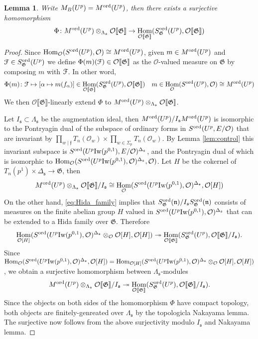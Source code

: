 \documentclass[leqno]{amsart}
\newtheorem{lem}[thm]{Lemma}
\theoremstyle{definition}
\theoremstyle{remark}
\newcommand{\oo}{\mathcal{O}}
\DeclareMathOperator{\Hom}{Hom}
\newcommand{\ff}{\mathfrak{f}}
\newcommand{\fn}{\mathfrak{n}}
\newcommand{\fs}{\mathfrak{s}}
\newcommand{\fG}{\mathfrak{G}}
\newcommand{\Iw}{\textnormal{Iw}} %
\newcommand{\euF}{\EuScript{F}} %
\newcommand{\ord}{\textnormal{ord}} %
\begin{document}
\begin{lem}\label{prop:ord_to_dual}
    Write $M_B(U^p)=M^{\ord}(U^p)$, then there exists
    a surjective homomorphism
	\[
		\Phi\colon M^{\ord}(U^p)\otimes_{\Lambda_\fs}
        \oo\llbracket\fG\rrbracket \to 
		\Hom_{\oo\llbracket\fG\rrbracket}
		(S_\fG^{\ord}(U^p),\oo\llbracket\fG\rrbracket)
	\]
\end{lem}
\begin{proof}
Since $\Hom_\oo(S^{\ord}(U^p),\oo)\cong M^{\ord}(U^p)$,
given $m\in M^{\ord}(U^p)$ and
$\euF\in S_\fG^{\ord}(U^p)$
we define $\Phi(m)(\euF)\in\oo\llbracket\fG\rrbracket$ as the 
$\oo$-valued measure on $\fG$
by composing $m$ with $\euF$.
In other word, 
\begin{equation}
	\Phi(m)\colon \euF\mapsto
	[\alpha\mapsto m(f_\alpha)]
	\in \Hom_{\oo\llbracket\fG\rrbracket}
	(S_\fG^{\ord}(U^p),\oo\llbracket\fG\rrbracket)\quad
	m\in \Hom_\oo(S^{\ord}(U^p),\oo)\cong M^{\ord}(U^p)
\end{equation}
We then $\oo\llbracket\fG\rrbracket$-linearly extend $\Phi$ to
$M^{\ord}(U^p)\otimes_{\Lambda_\fs}
\oo\llbracket\fG\rrbracket$.

Let $I_\fs\subset\Lambda_{\fs}$
be the augmentation ideal,
then $M^{\ord}(U^p)/I_\fs M^{\ord}(U^p)$
is isomorphic to the Pontryagin dual of the subspace of
ordinary forms in $S^{\ord}(U^p,E/\oo)$ that are invariant by
$\prod_{w\mid \ff}T_n(\oo_w)\times \prod_{w\in\Sigma_p}T_n(\oo_w)$.
By Lemma \ref{lem:control}
this invariant subspace is 
$S^{\ord}(U^p\Iw(p^{0,1}),E/\oo)^{\Delta_{\fs}}$,
and the Pontryagin dual of which is isomorphic to
$\Hom_{\oo}(S^{\ord}(U^p\Iw(p^{0,1}),\oo)^{\Delta_{\fs}},\oo)$.
Let $H$ be the cokernel of 
$T_n(p^1)\times\Delta_\fs\to \fG$, 
then
\[
    M^{\ord}(U^p)\otimes_{\Lambda_{\fs}}
    \oo\llbracket \fG\rrbracket /I_\fs\cong 
    \Hom_{\oo}(S^{\ord}(U^p\Iw(p^{0,1}),\oo)^{\Delta_{\fs}},
    \oo[H])  
\]
On the other hand, \eqref{eq:Hida_family}
implies that
$S^{\ord}_\fG(\fn)/I_\fs S^{\ord}_\fG(\fn)$
consists of measures on the finite abelian group $H$
valued in 
$S^{\ord}(U^p\Iw(p^{0,1}),\oo)^{\Delta_{\fs}}$
that can be extended to a Hida family over $\fG$.
Therefore
\[
    \Hom_{\oo[H]}(S^{\ord}(U^p\Iw(p^{0,1}),\oo)^{\Delta_{\fs}}
    \otimes_{\oo}\oo[H],
    \oo[H])
    \twoheadrightarrow
    \Hom_{\oo\llbracket\fG\rrbracket}(S^{\ord}_\fG(U^p),
    \oo\llbracket\fG\rrbracket/I_\fs).
\]
Since 
$\Hom_{\oo}(S^{\ord}(U^p\Iw(p^{0,1}),\oo)^{\Delta_{\fs}}
,\oo[H])=
\Hom_{\oo[H]}(S^{\ord}(U^p\Iw(p^{0,1}),\oo)^{\Delta_{\fs}}
\otimes_{\oo}\oo[H], \oo[H])$, 
we obtain a surjective homomorphism
between $\Lambda_{\fs}$-modules
\[
    M^{\ord}(U^p)\otimes_{\Lambda_{\fs}}
    \oo\llbracket \fG\rrbracket /I_\fs
    \twoheadrightarrow 
    \Hom_{\oo\llbracket\fG\rrbracket}(S^{\ord}_\fG(U^p),
    \oo\llbracket\fG\rrbracket/I_\fs).
\]
Since the objects on both sides of the homomorphism $\Phi$
have compact topology, both objects 
are finitely-genreated over $\Lambda_{\fs}$
by the topologicla Nakayama lemma.
The surjective now follows from the above surjectivity
modulo $I_{\fs}$ and Nakayama lemma.
\end{proof}
\end{document}
